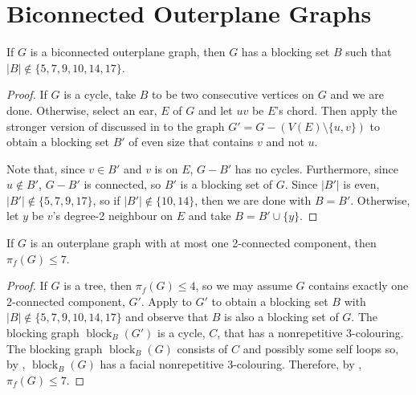 \documentclass{patmorin}
\DeclareMathOperator{\block}{block}
\begin{document}



\appendix
\section{Biconnected Outerplane Graphs}

\begin{lem}
  If $G$ is a biconnected outerplane graph, then $G$ has a blocking set $B$
  such that $|B|\not\in\{5,7,9,10,14,17\}$.
\end{lem}

\begin{proof}
  If $G$ is a cycle, take $B$ to be two consecutive vertices on $G$
  and we are done.
  Otherwise, select an ear, $E$ of $G$ and let $uv$ be $E$'s chord.
  Then apply the stronger version of  discussed in
   to the graph $G'=G-(V(E)\setminus\{u,v\})$ to obtain a
  blocking set $B'$ of even size that contains $v$ and not $u$.

  Note that, since $v\in B'$ and $v$ is on $E$,  $G-B'$ has no cycles.
  Furthermore, since $u\not\in B'$, $G-B'$ is connected, so $B'$
  is a blocking set of $G$.  Since $|B'|$ is even, 
  $|B'|\not\in\{5,7,9,17\}$, so if $|B'|\not\in\{10, 14\}$, then we are
  done with $B=B'$. Otherwise, let $y$ be $v$'s degree-2 neighbour on $E$
  and take $B=B'\cup\{y\}$.
\end{proof}

\begin{cor}
  If $G$ is an outerplane graph with at most one 2-connected component, 
  then $\pi_f(G)\le 7$.
\end{cor}

\begin{proof}
  If $G$ is a tree, then $\pi_f(G)\le 4$, so we may assume $G$ contains
  exactly one 2-connected component, $G'$.  Apply  to
  $G'$ to obtain a blocking set $B$ with $|B|\not\in\{5,7,9,10,14,17\}$
  and observe that $B$ is also a blocking set of $G$.  The blocking graph
  $\block_B(G')$ is a cycle, $C$, that has a nonrepetitive 3-colouring.
  The blocking graph $\block_B(G)$ consists of $C$ and possibly some
  self loops so, by , $\block_B(G)$ has a facial
  nonrepetitive 3-colouring.  Therefore, by ,
  $\pi_f(G)\le 7$.
\end{proof}
\end{document}
